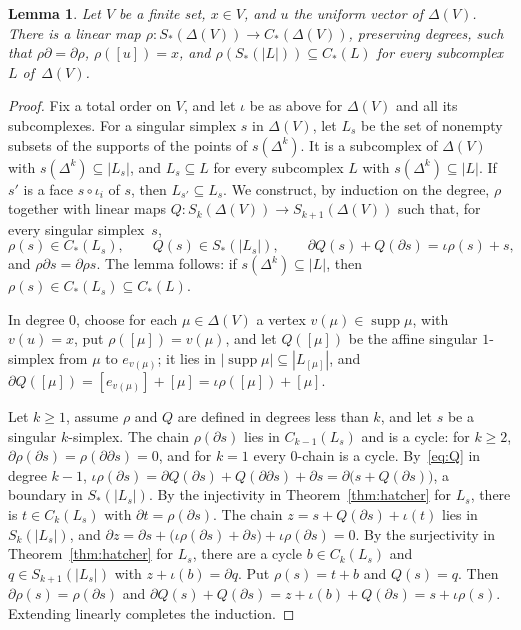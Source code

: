 \documentclass[11pt]{article}
\newtheorem{lemma}[theorem]{Lemma}
\theoremstyle{definition}
\numberwithin{equation}{section}
\DeclareMathOperator{\supp}{supp}
\begin{document}
\begin{lemma}\label{lem:comparison}
Let $V$ be a finite set, $x\in V$, and $u$ the uniform vector of $\Delta(V)$. There is a linear map $\rho:S_\ast(\Delta(V))\to C_\ast(\Delta(V))$, preserving degrees, such that $\rho\partial=\partial\rho$, $\rho([u])=x$, and $\rho(S_\ast(|L|))\subseteq C_\ast(L)$ for every subcomplex $L$ of~$\Delta(V)$.
\end{lemma}
\begin{proof}
Fix a total order on $V$, and let $\iota$ be as above for $\Delta(V)$ and all its subcomplexes. For a singular simplex $s$ in $\Delta(V)$, let $L_s$ be the set of nonempty subsets of the supports of the points of $s(\Delta^k)$. It is a subcomplex of $\Delta(V)$ with $s(\Delta^k)\subseteq|L_s|$, and $L_s\subseteq L$ for every subcomplex $L$ with $s(\Delta^k)\subseteq|L|$. If $s'$ is a face $s\circ\iota_i$ of $s$, then $L_{s'}\subseteq L_s$. We construct, by induction on the degree, $\rho$ together with linear maps $Q:S_k(\Delta(V))\to S_{k+1}(\Delta(V))$ such that, for every singular simplex~$s$,
\begin{equation}\label{eq:Q}
 \rho(s)\in C_\ast(L_s),\qquad Q(s)\in S_\ast(|L_s|),\qquad \partial Q(s)+Q(\partial s)=\iota\rho(s)+s,
\end{equation}
and $\rho\partial s=\partial\rho s$. The lemma follows: if $s(\Delta^k)\subseteq|L|$, then $\rho(s)\in C_\ast(L_s)\subseteq C_\ast(L)$.

In degree $0$, choose for each $\mu\in\Delta(V)$ a vertex $v(\mu)\in\supp\mu$, with $v(u)=x$, put $\rho([\mu])=v(\mu)$, and let $Q([\mu])$ be the affine singular $1$-simplex from $\mu$ to $e_{v(\mu)}$; it lies in $|\supp\mu|\subseteq|L_{[\mu]}|$, and $\partial Q([\mu])=[e_{v(\mu)}]+[\mu]=\iota\rho([\mu])+[\mu]$.

Let $k\ge1$, assume $\rho$ and $Q$ are defined in degrees less than $k$, and let $s$ be a singular $k$-simplex. The chain $\rho(\partial s)$ lies in $C_{k-1}(L_s)$ and is a cycle: for $k\ge2$, $\partial\rho(\partial s)=\rho(\partial\partial s)=0$, and for $k=1$ every $0$-chain is a cycle. By~\eqref{eq:Q} in degree $k-1$, $\iota\rho(\partial s)=\partial Q(\partial s)+Q(\partial\partial s)+\partial s=\partial\bigl(s+Q(\partial s)\bigr)$, a boundary in $S_\ast(|L_s|)$. By the injectivity in Theorem~\ref{thm:hatcher} for $L_s$, there is $t\in C_k(L_s)$ with $\partial t=\rho(\partial s)$. The chain $z=s+Q(\partial s)+\iota(t)$ lies in $S_k(|L_s|)$, and $\partial z=\partial s+\bigl(\iota\rho(\partial s)+\partial s\bigr)+\iota\rho(\partial s)=0$. By the surjectivity in Theorem~\ref{thm:hatcher} for $L_s$, there are a cycle $b\in C_k(L_s)$ and $q\in S_{k+1}(|L_s|)$ with $z+\iota(b)=\partial q$. Put $\rho(s)=t+b$ and $Q(s)=q$. Then $\partial\rho(s)=\rho(\partial s)$ and $\partial Q(s)+Q(\partial s)=z+\iota(b)+Q(\partial s)=s+\iota\rho(s)$. Extending linearly completes the induction.
\end{proof}
\end{document}
